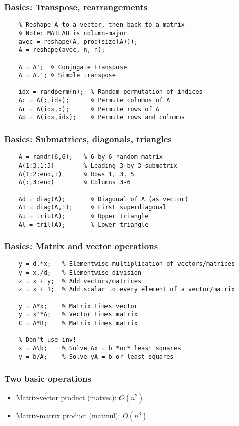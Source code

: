 \documentclass{beamer}
\begin{document}
\begin{frame}[fragile]
  \frametitle{Basics: Transpose, rearrangements}

  \begin{lstlisting}
    % Reshape A to a vector, then back to a matrix
    % Note: MATLAB is column-major
    avec = reshape(A, prod(size(A)));
    A = reshape(avec, n, n);
    
    A = A';  % Conjugate transpose
    A = A.'; % Simple transpose

    idx = randperm(n);  % Random permutation of indices
    Ac = A(:,idx);      % Permute columns of A
    Ar = A(idx,:);      % Permute rows of A
    Ap = A(idx,idx);    % Permute rows and columns
  \end{lstlisting}
\end{frame}

\begin{frame}[fragile]
  \frametitle{Basics: Submatrices, diagonals, triangles}
  
  \begin{lstlisting}
    A = randn(6,6);   % 6-by-6 random matrix
    A(1:3,1:3)        % Leading 3-by-3 submatrix
    A(1:2:end,:)      % Rows 1, 3, 5
    A(:,3:end)        % Columns 3-6
    
    Ad = diag(A);       % Diagonal of A (as vector)
    A1 = diag(A,1);     % First superdiagonal
    Au = triu(A);       % Upper triangle
    Al = tril(A);       % Lower triangle
  \end{lstlisting}
\end{frame}

\begin{frame}[fragile]
  \frametitle{Basics: Matrix and vector operations}
  
  \begin{lstlisting}
    y = d.*x;   % Elementwise multiplication of vectors/matrices
    y = x./d;   % Elementwise division
    z = x + y;  % Add vectors/matrices
    z = x + 1;  % Add scalar to every element of a vector/matrix
    
    y = A*x;    % Matrix times vector
    y = x'*A;   % Vector times matrix
    C = A*B;    % Matrix times matrix

    % Don't use inv!
    x = A\b;    % Solve Ax = b *or* least squares
    y = b/A;    % Solve yA = b or least squares
  \end{lstlisting}
\end{frame}

\begin{frame}
  \frametitle{Two basic operations}

  \begin{itemize}
  \item Matrix-vector product (matvec): $O(n^2)$
  \item Matrix-matrix product (matmul): $O(n^3)$
  \end{itemize}
\end{frame}
\end{document}
